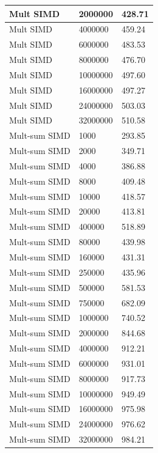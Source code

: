 \documentclass{article}
\begin{document}
\begin{longtable}{|l|l|l|}
Mult SIMD         & 2000000   & 428.71    \\ \hline
Mult SIMD         & 4000000   & 459.24    \\ \hline
Mult SIMD         & 6000000   & 483.53    \\ \hline
Mult SIMD         & 8000000   & 476.70    \\ \hline
Mult SIMD         & 10000000  & 497.60    \\ \hline
Mult SIMD         & 16000000  & 497.27    \\ \hline
Mult SIMD         & 24000000  & 503.03    \\ \hline
Mult SIMD         & 32000000  & 510.58    \\ \hline
Mult-sum SIMD     & 1000      & 293.85    \\ \hline
Mult-sum SIMD     & 2000      & 349.71    \\ \hline
Mult-sum SIMD     & 4000      & 386.88    \\ \hline
Mult-sum SIMD     & 8000      & 409.48    \\ \hline
Mult-sum SIMD     & 10000     & 418.57    \\ \hline
Mult-sum SIMD     & 20000     & 413.81    \\ \hline
Mult-sum SIMD     & 400000    & 518.89    \\ \hline
Mult-sum SIMD     & 80000     & 439.98    \\ \hline
Mult-sum SIMD     & 160000    & 431.31    \\ \hline
Mult-sum SIMD     & 250000    & 435.96    \\ \hline
Mult-sum SIMD     & 500000    & 581.53    \\ \hline
Mult-sum SIMD     & 750000    & 682.09    \\ \hline
Mult-sum SIMD     & 1000000   & 740.52    \\ \hline
Mult-sum SIMD     & 2000000   & 844.68    \\ \hline
Mult-sum SIMD     & 4000000   & 912.21    \\ \hline
Mult-sum SIMD     & 6000000   & 931.01    \\ \hline
Mult-sum SIMD     & 8000000   & 917.73    \\ \hline
Mult-sum SIMD     & 10000000  & 949.49    \\ \hline
Mult-sum SIMD     & 16000000  & 975.98    \\ \hline
Mult-sum SIMD     & 24000000  & 976.62    \\ \hline
Mult-sum SIMD     & 32000000  & 984.21    \\ \hline
\end{longtable}
\end{document}
